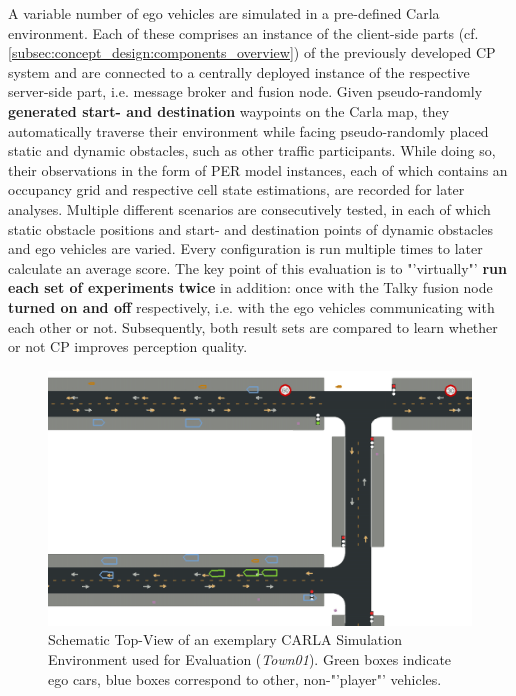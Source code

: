 A variable number of ego vehicles are simulated in a pre-defined Carla environment. Each of these comprises an instance of the client-side parts (cf. \cref{subsec:concept_design:components_overview}) of the previously developed CP system and are connected to a centrally deployed instance of the respective server-side part, i.e. message broker and fusion node. Given pseudo-randomly \textbf{generated start- and destination} waypoints on the Carla map, they automatically traverse their environment while facing pseudo-randomly placed static and dynamic obstacles, such as other traffic participants. While doing so, their observations in the form of PER model instances, each of which contains an occupancy grid and respective cell state estimations, are recorded for later analyses. Multiple different scenarios are consecutively tested, in each of which static obstacle positions and start- and destination points of dynamic obstacles and ego vehicles are varied. Every configuration is run multiple times to later calculate an average score. The key point of this evaluation is to "'virtually"' \textbf{run each set of experiments twice} in addition: once with the Talky fusion node \textbf{turned on and off} respectively, i.e. with the ego vehicles communicating with each other or not. Subsequently, both result sets are compared to learn whether or not CP improves perception quality.

\begin{figure}
	\centering
	\includegraphics[width=1\linewidth]{98_images/evaluation_scene_topview_cropped}
	\caption[Top-View of the Simulation Environment used for Evaluation]{Schematic Top-View of an exemplary CARLA Simulation Environment used for Evaluation (\textit{Town01}). Green boxes indicate ego cars, blue boxes correspond to other, non-"'player"' vehicles.}
	\label{fig:carla_scene_topview}
\end{figure}

